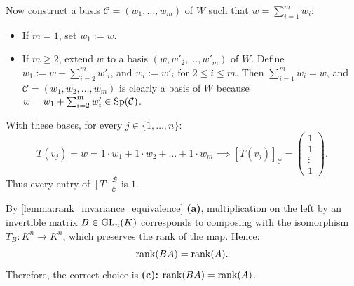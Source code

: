 \begin{exercisesolution}
\begin{itemize}
    Now construct a basis $\mathcal{C} = (w_1, \dots, w_m)$ of $W$ such that $w = \sum_{i=1}^m w_i$:
    \begin{itemize}
        \item If $m = 1$, set $w_1 := w$.
        \item If $m \ge 2$, extend $w$ to a basis $(w, w'_2, \dots, w'_m)$ of $W$. Define $w_1 := w - \sum_{i=2}^m w'_i$, and $w_i := w'_i$ for $2 \le i \le m$. Then $\sum_{i=1}^m w_i = w$, and $\mathcal{C} = (w_1, w_2, \dots, w_m)$ is clearly a basis of $W$ because $w = w_1 + \sum_{i=2}^m w'_i \in \operatorname{Sp}(\mathcal{C})$.
    \end{itemize}
    With these bases, for every $j \in \{1, \dots, n\}$:
    \[
    T(v_j) = w = 1 \cdot w_1 + 1 \cdot w_2 + \dots + 1 \cdot w_m \implies [T(v_j)]_{\mathcal{C}} = \begin{pmatrix} 1 \\ 1 \\ \vdots \\ 1 \end{pmatrix}.
    \]
    Thus every entry of $[T]_{\mathcal{C}}^{\mathcal{B}}$ is $1$.
\end{itemize}
\end{exercisesolution}

\begin{exercisesolution*}
\label{sol:rank_invariance_invertible_matrix_sc}
By \cref{lemma:rank_invariance_equivalence} \textbf{(a)}, multiplication on the left by an invertible matrix $B \in \operatorname{GL}_n(K)$ corresponds to composing with the isomorphism $T_B \colon K^n \to K^n$, which preserves the rank of the map. Hence:
\[
\operatorname{rank}(BA) = \operatorname{rank}(A).
\]
Therefore, the correct choice is \textbf{(c): $\operatorname{rank}(BA) = \operatorname{rank}(A)$}.
\end{exercisesolution*}

